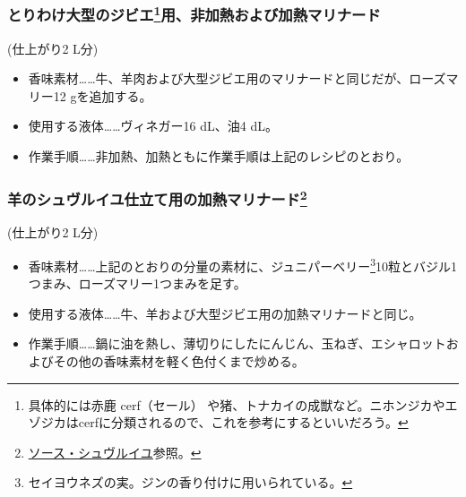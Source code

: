 \begin{recette}
\hypertarget{marinade-crue-ou-cuite-pour-grosse-venaison}{%
\subsubsection[とりわけ大型のジビエ用、非加熱および加熱マリナード]{\texorpdfstring{とりわけ大型のジビエ\footnote{具体的には赤鹿
  cerf（セール）
  や猪、トナカイの成獣など。ニホンジカやエゾジカはcerfに分類されるので、これを参考にするといいだろう。}用、非加熱および加熱マリナード}{とりわけ大型のジビエ用、非加熱および加熱マリナード}}\label{marinade-crue-ou-cuite-pour-grosse-venaison}}



(仕上がり2 L分)

\begin{itemize}
\item
  香味素材\ldots{}\ldots{}牛、羊肉および大型ジビエ用のマリナードと同じだが、ローズマリー12
  gを追加する。
\item
  使用する液体\ldots{}\ldots{}ヴィネガー16 dL、油4 dL。
\item
  作業手順\ldots{}\ldots{}非加熱、加熱ともに作業手順は上記のレシピのとおり。
\end{itemize}

\hypertarget{marinade-cuite-pour-le-mouton-en-chevreuil}{%
\subsubsection[羊のシュヴルイユ仕立て用の加熱マリナード]{\texorpdfstring{羊のシュヴルイユ仕立て用の加熱マリナード\footnote{\protect\hyperlink{sauce-chevreuil}{ソース・シュヴルイユ}参照。}}{羊のシュヴルイユ仕立て用の加熱マリナード}}\label{marinade-cuite-pour-le-mouton-en-chevreuil}}



(仕上がり2 L分)

\begin{itemize}
\item
  香味素材\ldots{}\ldots{}上記のとおりの分量の素材に、ジュニパーベリー\footnote{セイヨウネズの実。ジンの香り付けに用いられている。}10粒とバジル1つまみ、ローズマリー1つまみを足す。
\item
  使用する液体\ldots{}\ldots{}牛、羊および大型ジビエ用の加熱マリナードと同じ。
\item
  作業手順\ldots{}\ldots{}鍋に油を熱し、薄切りにしたにんじん、玉ねぎ、エシャロットおよびその他の香味素材を軽く色付くまで炒める。


\end{itemize}
\end{recette}
